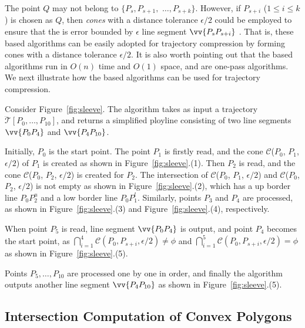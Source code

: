 The point $Q$ may not belong to $\{P_{s}, P_{s+1},$ $\ldots, P_{s+k}\}$.
However, if $P_{s+i}$ ($1\le i\le k$) is chosen as $Q$, then \emph{cones} with a distance tolerance $\epsilon/2$ could be employed to ensure that the \ped is error bounded by $\epsilon$ \wrt line segment $\vv{P_sP_{s+i}}$ \cite{Zhao:Sleeve}. That is, these \cia based algorithms can be easily adopted for trajectory compression by forming cones with a distance tolerance $\epsilon/2$.  It is also worth pointing out that the \cia based algorithms  run in $O(n)$ time and $O(1)$ space, and are one-pass algorithms.
%
We next illustrate how the \cia based algorithms can be used for trajectory compression.



\begin{example}
\label{exm-alg-sleeve}
Consider Figure~\ref{fig:sleeve}. The \cia algorithm takes as input a trajectory $\dddot{\mathcal{T}}[P_0, \ldots, P_{10}]$, and returns a simplified ployline consisting of two line segments $\vv{P_0P_4}$ and  $\vv{P_4P_{10}}$.

Initially, $P_0$ is the start point. The point $P_1$ is firstly read, and the cone $\mathcal{C}$($P_0$, $P_{1}$, $\epsilon/2$) of $P_1$ is created as shown in Figure~\ref{fig:sleeve}.(1).
Then $P_2$ is read, and the cone $\mathcal{C}$($P_0$, $P_{2}$, $\epsilon/2$) is created for $P_2$. The intersection of $\mathcal{C}$($P_0$, $P_{1}$, $\epsilon/2$) and $\mathcal{C}$($P_0$, $P_{2}$, $\epsilon/2$) is not empty as shown in Figure~\ref{fig:sleeve}.(2), which has a up border line $P_0P_2^u$ and a low border line $P_0P_1^l$.
%
Similarly, points $P_3$ and $P_4$ are processed, as shown in Figure~\ref{fig:sleeve}.(3) and Figure~\ref{fig:sleeve}.(4), respectively.

When point $P_5$ is read,  line segment $\vv{P_0P_4}$ is output, and point $P_4$ becomes the start point, as $\bigcap_{i=1}^{4}\mathcal{C}(P_0, P_{s+i}, \epsilon/2) \ne \phi$ and $\bigcap_{i=1}^{5}\mathcal{C}(P_0, P_{s+i}, \epsilon/2) = \phi$ as shown in Figure~\ref{fig:sleeve}.(5).


Points $P_5, \ldots, P_{10}$ are processed one by one in order, and finally the algorithm outputs another line segment $\vv{P_4P_{10}}$ as shown in Figure~\ref{fig:sleeve}.(5).
\end{example}




\subsection{Intersection Computation of Convex Polygons}

